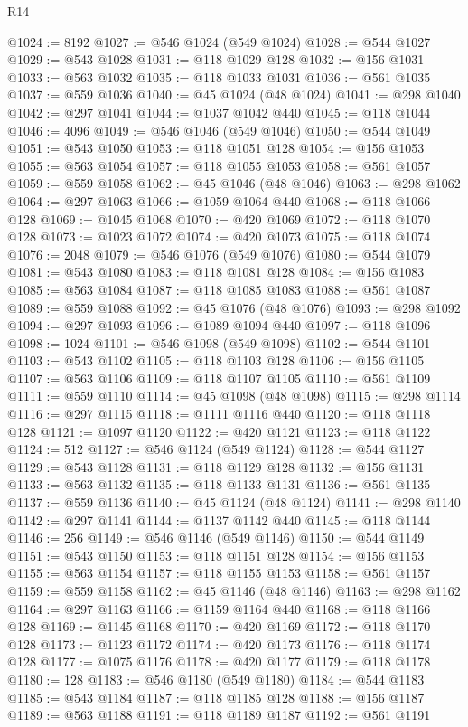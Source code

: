 \begin{lexlean}{R14}
\begin{coremodule}
@1024 := 8192
@1027 := @546 @1024 (@549 @1024)
@1028 := @544 @1027
@1029 := @543 @1028
@1031 := @118 @1029 @128
@1032 := @156 @1031
@1033 := @563 @1032
@1035 := @118 @1033 @1031
@1036 := @561 @1035
@1037 := @559 @1036
@1040 := @45 @1024 (@48 @1024)
@1041 := @298 @1040
@1042 := @297 @1041
@1044 := @1037 @1042 @440
@1045 := @118 @1044
@1046 := 4096
@1049 := @546 @1046 (@549 @1046)
@1050 := @544 @1049
@1051 := @543 @1050
@1053 := @118 @1051 @128
@1054 := @156 @1053
@1055 := @563 @1054
@1057 := @118 @1055 @1053
@1058 := @561 @1057
@1059 := @559 @1058
@1062 := @45 @1046 (@48 @1046)
@1063 := @298 @1062
@1064 := @297 @1063
@1066 := @1059 @1064 @440
@1068 := @118 @1066 @128
@1069 := @1045 @1068
@1070 := @420 @1069
@1072 := @118 @1070 @128
@1073 := @1023 @1072
@1074 := @420 @1073
@1075 := @118 @1074
@1076 := 2048
@1079 := @546 @1076 (@549 @1076)
@1080 := @544 @1079
@1081 := @543 @1080
@1083 := @118 @1081 @128
@1084 := @156 @1083
@1085 := @563 @1084
@1087 := @118 @1085 @1083
@1088 := @561 @1087
@1089 := @559 @1088
@1092 := @45 @1076 (@48 @1076)
@1093 := @298 @1092
@1094 := @297 @1093
@1096 := @1089 @1094 @440
@1097 := @118 @1096
@1098 := 1024
@1101 := @546 @1098 (@549 @1098)
@1102 := @544 @1101
@1103 := @543 @1102
@1105 := @118 @1103 @128
@1106 := @156 @1105
@1107 := @563 @1106
@1109 := @118 @1107 @1105
@1110 := @561 @1109
@1111 := @559 @1110
@1114 := @45 @1098 (@48 @1098)
@1115 := @298 @1114
@1116 := @297 @1115
@1118 := @1111 @1116 @440
@1120 := @118 @1118 @128
@1121 := @1097 @1120
@1122 := @420 @1121
@1123 := @118 @1122
@1124 := 512
@1127 := @546 @1124 (@549 @1124)
@1128 := @544 @1127
@1129 := @543 @1128
@1131 := @118 @1129 @128
@1132 := @156 @1131
@1133 := @563 @1132
@1135 := @118 @1133 @1131
@1136 := @561 @1135
@1137 := @559 @1136
@1140 := @45 @1124 (@48 @1124)
@1141 := @298 @1140
@1142 := @297 @1141
@1144 := @1137 @1142 @440
@1145 := @118 @1144
@1146 := 256
@1149 := @546 @1146 (@549 @1146)
@1150 := @544 @1149
@1151 := @543 @1150
@1153 := @118 @1151 @128
@1154 := @156 @1153
@1155 := @563 @1154
@1157 := @118 @1155 @1153
@1158 := @561 @1157
@1159 := @559 @1158
@1162 := @45 @1146 (@48 @1146)
@1163 := @298 @1162
@1164 := @297 @1163
@1166 := @1159 @1164 @440
@1168 := @118 @1166 @128
@1169 := @1145 @1168
@1170 := @420 @1169
@1172 := @118 @1170 @128
@1173 := @1123 @1172
@1174 := @420 @1173
@1176 := @118 @1174 @128
@1177 := @1075 @1176
@1178 := @420 @1177
@1179 := @118 @1178
@1180 := 128
@1183 := @546 @1180 (@549 @1180)
@1184 := @544 @1183
@1185 := @543 @1184
@1187 := @118 @1185 @128
@1188 := @156 @1187
@1189 := @563 @1188
@1191 := @118 @1189 @1187
@1192 := @561 @1191

\end{coremodule}
\end{lexlean}
